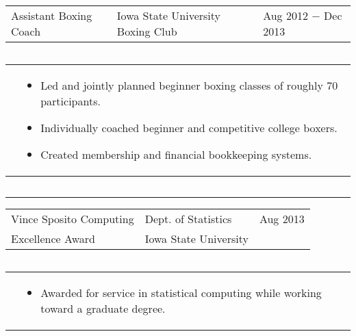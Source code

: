 \documentclass{article}
\newcommand{\q}{$\quad$ \newline}
\newcommand{\vl}{4.25}
\newcommand{\wl}{8.4}
\newcommand{\ww}{13}
\newcommand{\myrule}{\noindent \rule{\textwidth}{1pt}}
\begin{document}
 
 
 
\noindent \begin{tabular}{@{}p{\vl cm}p{\wl cm}l@{}}
Assistant Boxing Coach & Iowa State University Boxing Club & Aug 2012 $-$ Dec 2013
\end{tabular} \q 
 
\noindent \begin{tabular}{@{}p{\vl cm}p{\ww cm}@{}}
& \begin{itemize}
\item Led and jointly planned beginner boxing classes of roughly 70 participants. 
\item Individually coached beginner and competitive college boxers. 
\item Created membership and financial bookkeeping systems.
\end{itemize}
\end{tabular} \q 



 
\myrule

\noindent \begin{tabular}{@{}p{\vl cm}p{\wl cm}l@{}}
Vince Sposito Computing & Dept. of Statistics & Aug 2013 \\
Excellence Award & Iowa State University &
\end{tabular} \q

\noindent \begin{tabular}{@{}p{\vl cm}p{\ww cm}@{}}
& \begin{itemize}
\item Awarded for service in statistical computing while working toward a graduate degree.
\end{itemize}
\end{tabular} \q 
\end{document}
